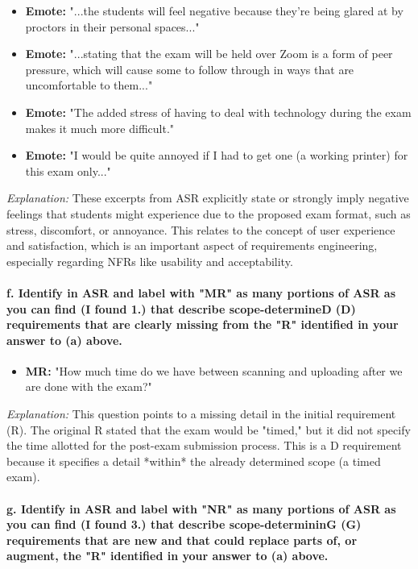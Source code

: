 \documentclass{article}
\begin{document}
\begin{itemize}
    \item \textbf{Emote:} "...the students will feel negative because they're being glared at by proctors in their personal spaces..."
    \item \textbf{Emote:} "...stating that the exam will be held over Zoom is a form of peer pressure, which will cause some to follow through in ways that are uncomfortable to them..."
    \item \textbf{Emote:} "The added stress of having to deal with technology during the exam makes it much more difficult."
    \item \textbf{Emote:} "I would be quite annoyed if I had to get one (a working printer) for this exam only..."
\end{itemize}

\textit{Explanation:} These excerpts from ASR explicitly state or strongly imply negative feelings that students might experience due to the proposed exam format, such as stress, discomfort, or annoyance. This relates to the concept of user experience and satisfaction, which is an important aspect of requirements engineering, especially regarding NFRs like usability and acceptability.

\paragraph{f. Identify in ASR and label with "MR" as many portions of ASR as you can find (I found 1.) that describe scope-determineD (D) requirements that are clearly missing from the "R" identified in your answer to (a) above.}

\begin{itemize}
    \item \textbf{MR:} "How much time do we have between scanning and uploading after we are done with the exam?"
\end{itemize}

\textit{Explanation:} This question points to a missing detail in the initial requirement (R). The original R stated that the exam would be "timed," but it did not specify the time allotted for the post-exam submission process. This is a D requirement because it specifies a detail *within* the already determined scope (a timed exam).

\paragraph{g. Identify in ASR and label with "NR" as many portions of ASR as you can find (I found 3.) that describe scope-determininG (G) requirements that are new and that could replace parts of, or augment, the "R" identified in your answer to (a) above.}
\end{document}
